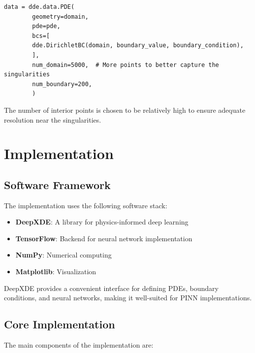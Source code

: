 \documentclass[12pt,a4paper]{report}
\begin{document}
	\begin{lstlisting}[caption={Domain discretization}]
		data = dde.data.PDE(
		geometry=domain,
		pde=pde,
		bcs=[
		dde.DirichletBC(domain, boundary_value, boundary_condition),
		],
		num_domain=5000,  # More points to better capture the singularities
		num_boundary=200,
		)
	\end{lstlisting}
	
	The number of interior points is chosen to be relatively high to ensure adequate resolution near the singularities.
	
	\chapter{Implementation}
	
	\section{Software Framework}
	The implementation uses the following software stack:
	\begin{itemize}
		\item \textbf{DeepXDE}: A library for physics-informed deep learning \cite{lu2021deepxde}
		\item \textbf{TensorFlow}: Backend for neural network implementation
		\item \textbf{NumPy}: Numerical computing
		\item \textbf{Matplotlib}: Visualization
	\end{itemize}
	
	DeepXDE provides a convenient interface for defining PDEs, boundary conditions, and neural networks, making it well-suited for PINN implementations.
	
	\section{Core Implementation}
	The main components of the implementation are:
	
\end{document}
